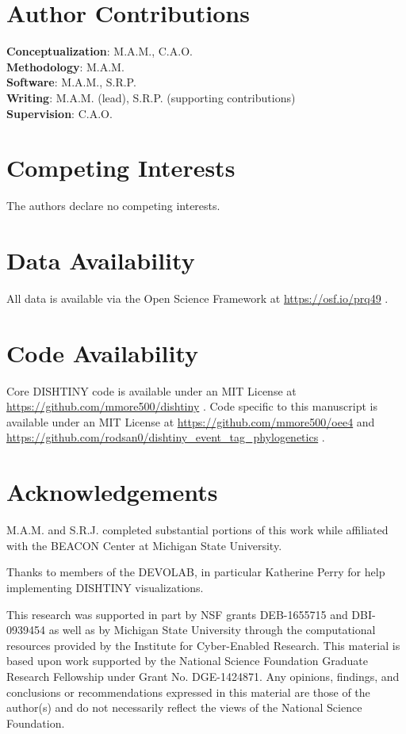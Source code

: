 \section*{Author Contributions}

\textbf{Conceptualization}: M.A.M., C.A.O. \\
\textbf{Methodology}: M.A.M. \\
\textbf{Software}: M.A.M., S.R.P. \\
\textbf{Writing}: M.A.M. (lead), S.R.P. (supporting contributions) \\
\textbf{Supervision}: C.A.O.

\section*{Competing Interests}

The authors declare no competing interests.

\section*{Data Availability}

All data is available via the Open Science Framework at \url{https://osf.io/prq49} \citep{Moreno_Rodriguez_Papa_2022}.

\section*{Code Availability}

Core DISHTINY code is available under an MIT License at \url{https://github.com/mmore500/dishtiny} \citep{moreno_2025_16990564}.
Code specific to this manuscript is available under an MIT License at \url{https://github.com/mmore500/oee4} and \url{https://github.com/rodsan0/dishtiny_event_tag_phylogenetics} \citep{matthew_andres_moreno_2024_16990558,rodsan0_2025_16990704}.

\section*{Acknowledgements}

M.A.M. and S.R.J. completed substantial portions of this work while affiliated with the BEACON Center at Michigan State University.

Thanks to members of the DEVOLAB, in particular Katherine Perry for help implementing DISHTINY visualizations.

This research was supported in part by NSF grants DEB-1655715 and DBI-0939454 as well as by Michigan State University through the computational resources provided by the Institute for Cyber-Enabled Research.
This material is based upon work supported by the National Science Foundation Graduate Research Fellowship under Grant No. DGE-1424871.
Any opinions, findings, and conclusions or recommendations expressed in this material are those of the author(s) and do not necessarily reflect the views of the National Science Foundation.

